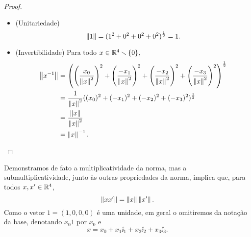 \begin{proof}
\begin{itemize}
	\item (Unitariedade)
		\begin{equation*}
		\left\Vert{1}\right\Vert = (1^2+0^2+0^2+0^2)^{\frac{1}{2}} = 1.
		\end{equation*}
	
	\item (Invertibilidade) Para todo $x \in \mathbb{R}^4 \smallsetminus \{0\}$,
		\begin{align*}
		\left\Vert{x^{-1}}\right\Vert &= \left(\left(\frac{x_0}{\left\Vert{x}\right\Vert^2}\right)^2 + \left(\frac{-x_1}{\left\Vert{x}\right\Vert^2}\right)^2 + \left(\frac{-x_2}{\left\Vert{x}\right\Vert^2}\right)^2 + \left(\frac{-x_3}{\left\Vert{x}\right\Vert^2}\right)^2\right)^{\frac{1}{2}} \\
			&= \frac{1}{\left\Vert{x}\right\Vert^2}((x_0)^2+(-x_1)^2+(-x_2)^2+(-x_3)^2)^{\frac{1}{2}} \\
			&= \frac{\left\Vert{x}\right\Vert}{\left\Vert{x}\right\Vert^2} \\
			&= \left\Vert{x}\right\Vert^{-1}.
			\qedhere
		\end{align*}
\end{itemize}
\end{proof}

Demonstramos de fato a multiplicatividade da norma, mas a submultiplicatividade, junto às outras propriedades da norma, implica que, para todos $x,x' \in \mathbb{R}^4$,
	\begin{equation*}
	\left\Vert{xx'}\right\Vert = \left\Vert{x}\right\Vert\left\Vert{x'}\right\Vert.
	\end{equation*}
Como o vetor $1 = (1,0,0,0)$ é uma unidade, em geral o omitiremos da notação da base, denotando $x_0 1$ por $x_0$ e
	\begin{equation*}
	x = x_0 + x_1 \ii_1 + x_2 \ii_2 + x_3 \ii_3.
	\end{equation*}

